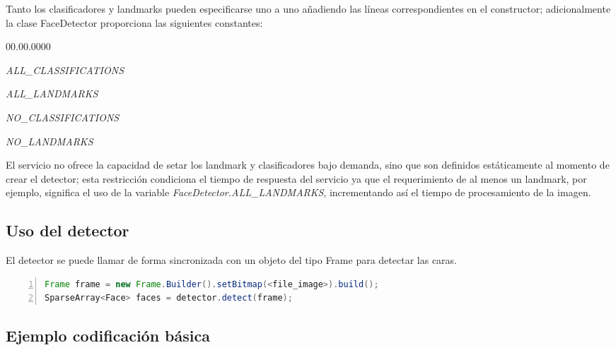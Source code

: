 Tanto los clasificadores y landmarks pueden especificarse uno a uno
añadiendo las líneas correspondientes en el constructor; adicionalmente
la clase FaceDetector proporciona las siguientes constantes: 
\begin{lyxlist}{00.00.0000}
\item [{\emph{ALL\_CLASSIFICATIONS}}]~
\item [{\emph{ALL\_LANDMARKS}}]~
\item [{\emph{NO\_CLASSIFICATIONS}}]~
\item [{\emph{NO\_LANDMARKS}}]~
\end{lyxlist}
El servicio no ofrece la capacidad de setar los landmark y clasificadores
bajo demanda, sino que son definidos estáticamente al momento de crear
el detector; esta restricción condiciona el tiempo de respuesta del
servicio ya que el requerimiento de al menos un landmark, por ejemplo,
significa el uso de la variable \emph{FaceDetector.ALL\_LANDMARKS},
incrementando así el tiempo de procesamiento de la imagen. 


\subsection*{Uso del detector}

El detector se puede llamar de forma sincronizada con un objeto del
tipo Frame para detectar las caras.

\begin{lstlisting}[language=Java,numbers=left,numberstyle={\tiny},basicstyle={\footnotesize},breaklines=true,captionpos=t,frame=no,keywordstyle={\color{blue}},commentstyle={\color{gray}},stringstyle={\color{red}},numbersep=5pt,emph={label}]
Frame frame = new Frame.Builder().setBitmap(<file_image>).build(); 
SparseArray<Face> faces = detector.detect(frame); 
\end{lstlisting}



\subsection*{Ejemplo codificación básica}

